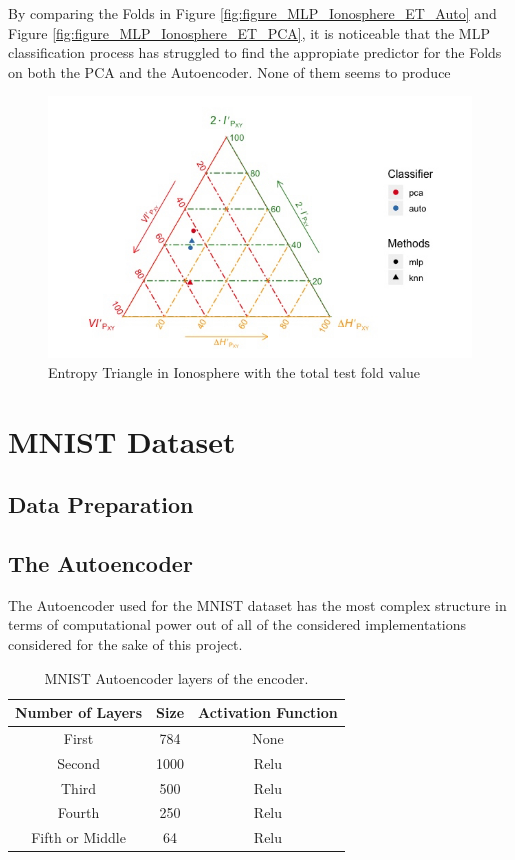 By comparing the Folds in Figure \ref{fig:figure_MLP_Ionosphere_ET_Auto} and Figure \ref{fig:figure_MLP_Ionosphere_ET_PCA}, it is noticeable that the MLP classification process has struggled to find the appropiate predictor for the Folds on both the PCA and the Autoencoder. None of them seems to produce  



\begin{figure}[H]
	\centering
	\includegraphics[width=1\linewidth]{Figuras_tfg/ET_Total_Ionosphere}
	\caption{Entropy Triangle in Ionosphere with the total test fold value}
	\label{fig:figure_Total_Ionosphere_ET}
\end{figure}


\section{MNIST Dataset}
\subsection{Data Preparation}

\subsection{The Autoencoder}
The Autoencoder used for the MNIST dataset has the most complex structure in terms of computational power out of all of the considered implementations considered for the sake of this project. 

\begin{table}[H]
	\caption{MNIST Autoencoder layers of the encoder.}
	\begin{center}
		\label{tab:table_MNIST_auto_encoder}
		\begin{tabular}{c|c|c} %
			\textbf{Number of Layers} & \textbf{Size} & \textbf{Activation Function} \\
			\hline
			First & 784 & None\\
			Second & 1000 & Relu\\
			Third & 500  & Relu\\
			Fourth & 250 & Relu\\
			Fifth or Middle & 64 & Relu\\
		\end{tabular}
	\end{center}
\end{table}

